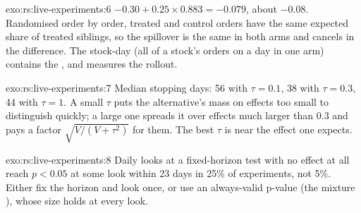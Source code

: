 \begin{solution}{exo:rs:live-experiments:6}
$-0.30 + 0.25 \times 0.883 = -0.079$, about $-0.08$. Randomised order by order, treated and control orders have the same expected share of treated
siblings, so the spillover is the same in both arms and cancels in the difference. The stock-day (all of a stock's orders on a day in one arm) contains the
, and measures the rollout.
\end{solution}

\begin{solution}{exo:rs:live-experiments:7}
Median stopping days: 56 with $\tau = 0.1$, 38 with $\tau = 0.3$, 44 with $\tau = 1$. A small $\tau$ puts the alternative's mass on effects too small to
distinguish quickly; a large one spreads it over effects much larger than 0.3 and pays a factor $\sqrt{V/(V+\tau^2)}$ for them. The best $\tau$ is near the
effect one expects.
\end{solution}

\begin{solution}{exo:rs:live-experiments:8}
Daily looks at a fixed-horizon test with no effect at all reach $p < 0.05$ at some look within 23 days in 25\% of experiments, not 5\%. Either fix the
horizon and look once, or use an always-valid p-value (the mixture ), whose size holds at every look.
\end{solution}

